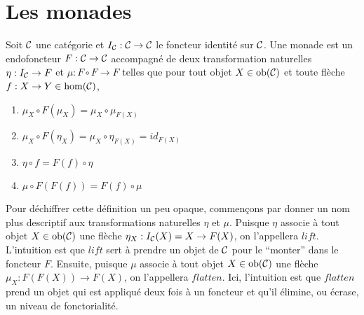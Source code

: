 \section{Les monades}


\begin{définition}[Monade]
    Soit $\mathcal{C}$ une catégorie et $I_{\mathcal{C}} : \mathcal{C} \to \mathcal{C}$ le foncteur identité sur
    $\mathcal{C}$. Une monade est un endofoncteur $F : \mathcal{C} \to \mathcal{C}$ accompagné de deux
    transformation naturelles $\eta : I_{\mathcal{C}} \to F$ et $\mu : F \circ F \to F$
    telles que pour tout objet $X \in \mathrm{ob}(\mathcal{C})$ et toute flèche
    $f : X \to Y \in \hom(\mathcal{C})$,
    \begin{enumerate}
        \item $\mu_X \circ F(\mu_X) = \mu_X \circ \mu_{F(X)}$
        \item $\mu_X \circ F(\eta_X) = \mu_X \circ \eta_{F(X)} = id_{F(X)}$
        \item $\eta \circ f = F(f) \circ \eta$
        \item $\mu \circ F(F(f)) = F(f) \circ \mu$
    \end{enumerate}
\end{définition}

Pour déchiffrer cette définition un peu opaque, commençons par donner un nom
plus descriptif aux transformations naturelles $\eta$ et $\mu$. Puisque $\eta$
associe à tout objet $X \in \mathrm{ob}(\mathcal{C})$ une flèche $\eta_X : I_{\mathcal{C}}(X) = X \to F(X)$,
on l'appellera $lift$. L'intuition est que $lift$ sert à prendre un objet de
$\mathcal{C}$ pour le ``monter'' dans le foncteur $F$. Ensuite, puisque $\mu$ associe
à tout objet $X \in \mathrm{ob}(\mathcal{C})$ une flèche $\mu_X : F(F(X)) \to F(X)$, on
l'appellera $flatten$. Ici, l'intuition est que $flatten$ prend un objet
qui est appliqué deux fois à un foncteur et qu'il élimine, ou écrase, un
niveau de fonctorialité.


